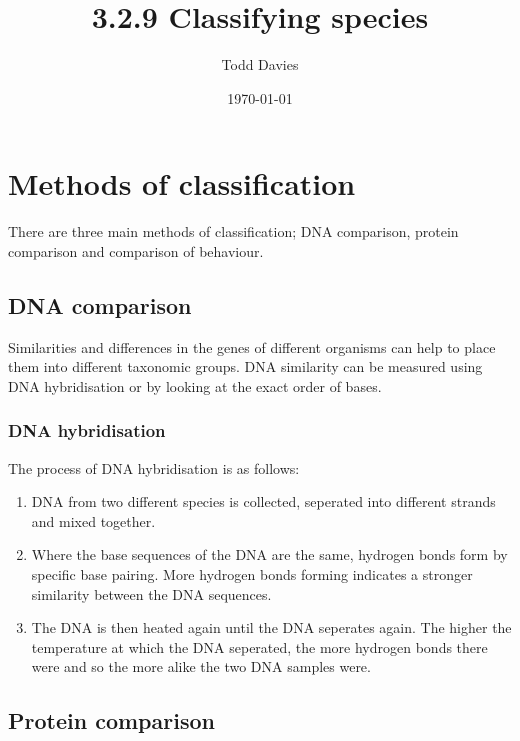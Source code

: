 \documentclass{article}
\author{Todd Davies}
\title{3.2.9 Classifying species}
\date{\today}
\begin{document}
\lhead{\today}

\maketitle

\section*{Methods of classification}
\thispagestyle{empty}

There are three main methods of classification; DNA comparison, protein
comparison and comparison of behaviour.

\subsection*{DNA comparison}

Similarities and differences in the genes of different organisms can help to
place them into different taxonomic groups. DNA similarity can be measured using
DNA hybridisation or by looking at the exact order of bases.

\subsubsection*{DNA hybridisation}

The process of DNA hybridisation is as follows:

\begin{enumerate}
	
	\item DNA from two different species is collected, seperated into different
	strands and mixed together.

	\item Where the base sequences of the DNA are the same, hydrogen bonds form
	by specific base pairing. More hydrogen bonds forming indicates a stronger
	similarity between the DNA sequences.

	\item The DNA is then heated again until the DNA seperates again. The higher
	the temperature at which the DNA seperated, the more hydrogen bonds there
	were and so the more alike the two DNA samples were.

\end{enumerate}

\subsection*{Protein comparison}
\end{document}
